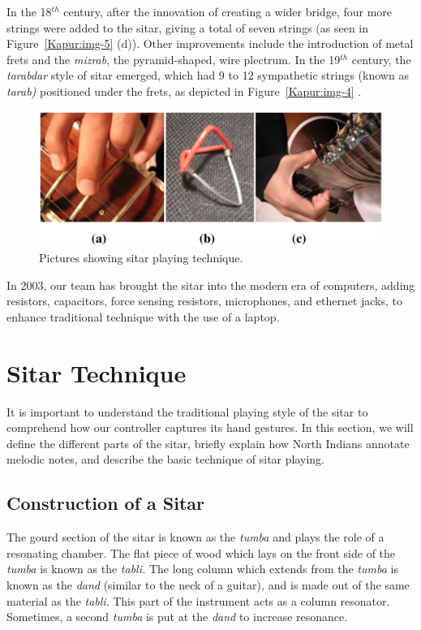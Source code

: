 In the 18$^{th}$ century, after the innovation of creating a wider bridge, four more strings were added to the sitar, giving a total of seven strings (as seen in Figure~\ref{Kapur:img-5} (d)). Other improvements include the introduction of metal frets and the \textit{mizrab}, the pyramid-shaped, wire plectrum. In the 19$^{th}$ century, the \textit{tarabdar} style of sitar emerged, which had 9 to 12 sympathetic strings (known as \textit{tarab)} positioned under the frets, as depicted in Figure~\ref{Kapur:img-4} \cite{Bagchee:1998}.


\begin{figure}[t]
\centering
\includegraphics[width=\textwidth]{img-6-eps-converted-to-crop.pdf}      
\caption{Pictures showing sitar playing technique.}
\label{Kapur:img-6}       %
\end{figure}


In 2003, our team has brought the sitar
into the modern era of computers, adding resistors, capacitors, force sensing
resistors, microphones, and ethernet jacks, to enhance traditional technique with
the use of a laptop.

\section{Sitar Technique}

It is important to understand the traditional playing style of the sitar to comprehend how our controller captures its hand gestures. In this section, we will define the different parts of the sitar, briefly explain how North Indians annotate melodic notes, and describe the basic technique of sitar playing.

\subsection{Construction of a Sitar}

The gourd section of the sitar is known as the \textit{tumba} and plays the role of a resonating chamber. The flat piece of wood which lays on the front side of the \textit{tumba} is known as the \textit{tabli. }The long column which extends from the \textit{tumba} is known as the \textit{dand }(similar to the neck of a guitar)\textit{, }and is made out of the same material as the \textit{tabli}. This part of the instrument acts as a column resonator. Sometimes, a second \textit{tumba} is put at the \textit{dand} to increase resonance.

